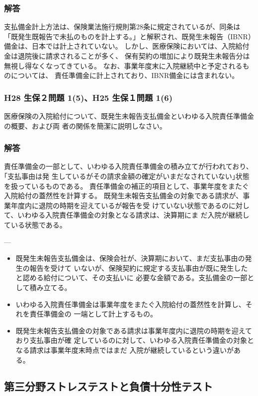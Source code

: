 \documentclass[report,gutter=10mm,fore-edge=10mm,uplatex,dvipdfmx]{jlreq}
\begin{document}
\subsubsection{解答}
支払備金計上方法は、保険業法施行規則第28条に規定されているが、同条は
「既発生既報告で未払のものを計上する。」と解釈され、既発生未報告（IBNR）備金は、日本では計上されていない。
しかし、医療保険においては、入院給付金は退院後に請求されることが多く、
保有契約の増加により既発生未報告分は無視し得なくなってきている。
なお、事業年度末に入院継続中と予定されるものについては、
責任準備金に計上されており、IBNR備金には含まれない。

\subsubsection{H28 生保２問題 1(5)、H25 生保１問題 1(6)}
医療保険の入院給付について、既発生未報告支払備金といわゆる入院責任準備金の概要、および両
者の関係を簡潔に説明しなさい。
\subsubsection{解答}

責任準備金の一部として、いわゆる入院責任準備金の積み立てが行われており、｢支払事由は発
生しているがその請求金額の確定がいまだなされていない｣状態を扱っているものである。
責任準備金の補正的項目として、事業年度をまたぐ入院給付の蓋然性を計算する。
既発生未報告支払備金の対象である請求が、事業年度内に退院の時期を迎えているが報告を受
けていない状態であるのに対して、いわゆる入院責任準備金の対象となる請求は、決算期にま
だ入院が継続している状態である。

---
\begin{itemize}
 \item 既発生未報告支払備金は、保険会社が、決算期において、まだ支払事由の発生の報告を受けて
いないが、保険契約に規定する支払事由が既に発生したと認める給付について、その支払いに
必要な金額である。支払備金の一部として積み立てる。
 \item いわゆる入院責任準備金は事業年度をまたぐ入院給付の蓋然性を計算し、それを責任準備金の
一端として計上するもの。
 \item 既発生未報告支払備金の対象である請求は事業年度内に退院の時期を迎えており支払事由が確
定しているのに対して、いわゆる入院責任準備金の対象となる請求は事業年度末時点ではまだ
入院が継続しているという違いがある。
\end{itemize}


\subsection{第三分野ストレステストと負債十分性テスト}
\end{document}
